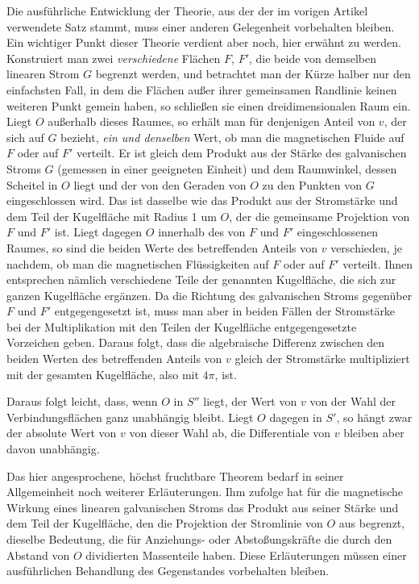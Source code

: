 Die ausführliche Entwicklung der Theorie, aus der der im vorigen Artikel verwendete Satz stammt, muss einer anderen Gelegenheit vorbehalten bleiben. Ein wichtiger Punkt dieser Theorie verdient aber noch, hier erwähnt zu werden. Konstruiert man zwei \textit{verschiedene} Flächen $F$, $F'$, die beide von demselben linearen Strom $G$ begrenzt werden, und betrachtet man der Kürze halber nur den einfachsten Fall, in dem die Flächen außer ihrer gemeinsamen Randlinie keinen weiteren Punkt gemein haben, so schließen sie einen dreidimensionalen Raum ein. Liegt $O$ außerhalb dieses Raumes, so erhält man für denjenigen Anteil von $v$, der sich auf $G$ bezieht, \textit{ein und denselben} Wert, ob man die magnetischen Fluide auf $F$ oder auf $F'$ verteilt. Er ist gleich dem Produkt aus der Stärke des galvanischen Stroms $G$ (gemessen in einer geeigneten Einheit) und dem Raumwinkel, dessen Scheitel in $O$ liegt und der von den Geraden von $O$ zu den Punkten von $G$ eingeschlossen wird. Das ist dasselbe wie das Produkt aus der Stromstärke und dem Teil der Kugelfläche mit Radius 1 um $O$, der die gemeinsame Projektion von $F$ und $F'$ ist. Liegt dagegen $O$ innerhalb des von $F$ und $F'$ eingeschlossenen Raumes, so sind die beiden Werte des betreffenden Anteils von $v$ verschieden, je nachdem, ob man die magnetischen Flüssigkeiten auf $F$ oder auf $F'$ verteilt. Ihnen entsprechen nämlich verschiedene Teile der genannten Kugelfläche, die sich zur ganzen Kugelfläche ergänzen. Da die Richtung des galvanischen Stroms gegenüber $F$ und $F'$ entgegengesetzt ist, muss man aber in beiden Fällen der Stromstärke bei der Multiplikation mit den Teilen der Kugelfläche entgegengesetzte Vorzeichen geben. Daraus folgt, dass die algebraische Differenz zwischen den beiden Werten
des betreffenden Anteils von $v$ gleich der Stromstärke multipliziert mit der gesamten Kugelfläche, also mit $4\pi$, ist.

Daraus folgt leicht, dass, wenn $O$ in $S''$ liegt, der Wert von $v$ von der Wahl der Verbindungsflächen ganz unabhängig bleibt. Liegt $O$ dagegen in $S'$, so hängt zwar der absolute Wert von $v$ von dieser Wahl ab, die Differentiale von $v$ bleiben aber davon unabhängig.

Das hier angesprochene, höchst fruchtbare Theorem bedarf in seiner Allgemeinheit noch weiterer Erläuterungen. Ihm zufolge hat für die magnetische Wirkung eines linearen galvanischen Stroms das Produkt aus seiner Stärke und dem Teil der Kugelfläche, den die Projektion der Stromlinie von $O$ aus begrenzt, dieselbe Bedeutung, die für Anziehungs- oder Abstoßungskräfte die durch den Abstand von $O$ dividierten Massenteile haben. Diese Erläuterungen müssen einer ausführlichen Behandlung des Gegenstandes vorbehalten bleiben.
